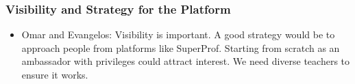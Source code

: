 \begin{enumerate}
\subsubsection*{Visibility and Strategy for the Platform}
\begin{itemize}
\item Omar and Evangelos: Visibility is important.
A good strategy would be to approach people from platforms like SuperProf. Starting from scratch as an ambassador with privileges could attract interest. We need diverse teachers to ensure it works.
\end{itemize}
\end{enumerate}